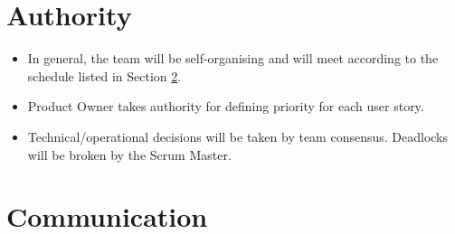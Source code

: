 \documentclass[a4paper, 12pt, titlepage]{article}
\begin{document}
    \section{Authority}
    \begin{itemize}
        \item In general, the team will be self-organising and will meet according to the schedule listed in Section \ref{communication}.
        \item Product Owner takes authority for defining priority for each user story.
        \item Technical/operational decisions will be taken by team consensus. Deadlocks will be broken by the Scrum Master.
    \end{itemize}


    \section{Communication} \label{communication}
\end{document}
